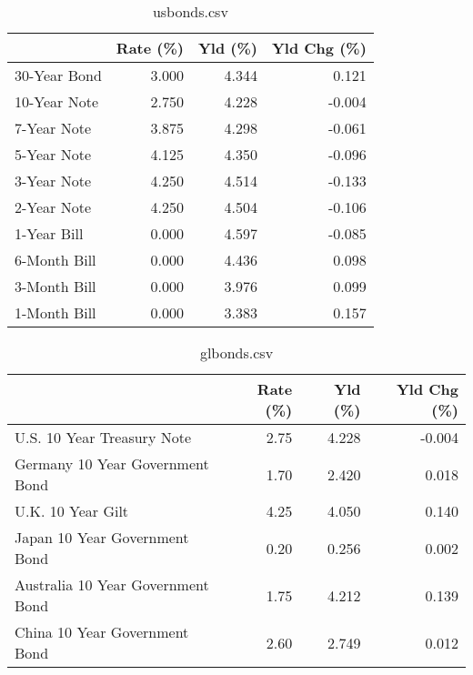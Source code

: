 \documentclass{article}%
\begin{document}
%


\begin{table}[htbp]%
\caption{usbonds.csv}%
\centering%
\begin{adjustbox}{width=1\textwidth}%
\begin{tabular}{lrrr}
\toprule
             &  Rate (\%) &  Yld (\%) &  Yld Chg (\%) \\
\midrule
30-Year Bond &     3.000 &    4.344 &        0.121 \\
10-Year Note &     2.750 &    4.228 &       -0.004 \\
 7-Year Note &     3.875 &    4.298 &       -0.061 \\
 5-Year Note &     4.125 &    4.350 &       -0.096 \\
 3-Year Note &     4.250 &    4.514 &       -0.133 \\
 2-Year Note &     4.250 &    4.504 &       -0.106 \\
 1-Year Bill &     0.000 &    4.597 &       -0.085 \\
6-Month Bill &     0.000 &    4.436 &        0.098 \\
3-Month Bill &     0.000 &    3.976 &        0.099 \\
1-Month Bill &     0.000 &    3.383 &        0.157 \\
\bottomrule
\end{tabular}
%
\end{adjustbox}%
\end{table}

%


\begin{table}[htbp]%
\caption{glbonds.csv}%
\centering%
\begin{adjustbox}{width=1\textwidth}%
\begin{tabular}{lrrr}
\toprule
                                  &  Rate (\%) &  Yld (\%) &  Yld Chg (\%) \\
\midrule
       U.S. 10 Year Treasury Note &      2.75 &    4.228 &       -0.004 \\
  Germany 10 Year Government Bond &      1.70 &    2.420 &        0.018 \\
                U.K. 10 Year Gilt &      4.25 &    4.050 &        0.140 \\
    Japan 10 Year Government Bond &      0.20 &    0.256 &        0.002 \\
Australia 10 Year Government Bond &      1.75 &    4.212 &        0.139 \\
    China 10 Year Government Bond &      2.60 &    2.749 &        0.012 \\
\bottomrule
\end{tabular}
%
\end{adjustbox}%
\end{table}
\end{document}
